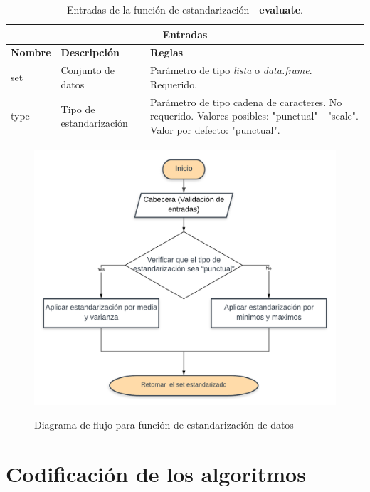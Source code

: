 \begin{table}[htb]
\begin{center}
\begin{tabular}{|p{3cm}|p{5cm}|p{8cm}|}
\hline
\multicolumn{3}{|c|}{\textbf{Entradas}} \\
\hline
\textbf{Nombre} & \textbf{Descripción} & \textbf{Reglas} \\
\hline \hline
set & Conjunto de datos & Parámetro de tipo \textit{lista} o \textit{data.frame}. Requerido. \\ \hline
type & Tipo de estandarización & Parámetro de tipo cadena de caracteres. No requerido. Valores posibles: "punctual" - "scale". Valor por defecto: "punctual".\\ \hline
\end{tabular}
\caption{Entradas de la función de estandarización - \textbf{evaluate}.}
\label{tabla:entradasStandardize}
\end{center}
\end{table}

\begin{figure}[h!]
	\caption{Diagrama de flujo para función de  estandarización de datos}
	\centering
	\includegraphics[scale=0.8]{standardize.png}
	\label{fig:standardize}
\end{figure}

\section{Codificación de los algoritmos}

